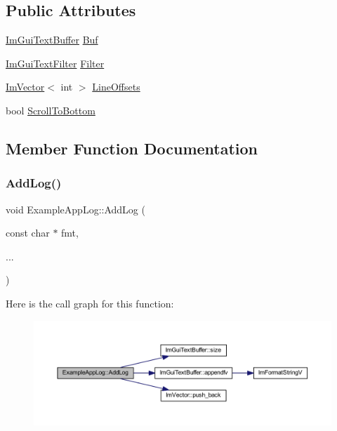 \subsection*{Public Attributes}
\begin{DoxyCompactItemize}
\item 
\mbox{\hyperlink{struct_im_gui_text_buffer}{Im\+Gui\+Text\+Buffer}} \mbox{\hyperlink{struct_example_app_log_a74fb7cd7bd8c2507b41331ebb7d0e56d}{Buf}}
\item 
\mbox{\hyperlink{struct_im_gui_text_filter}{Im\+Gui\+Text\+Filter}} \mbox{\hyperlink{struct_example_app_log_a4571947a6000e984ec8da9b7166e1e2b}{Filter}}
\item 
\mbox{\hyperlink{class_im_vector}{Im\+Vector}}$<$ int $>$ \mbox{\hyperlink{struct_example_app_log_af197fca7116f9033a5a5e831ee764ee2}{Line\+Offsets}}
\item 
bool \mbox{\hyperlink{struct_example_app_log_a6834b71563c0595e67b78afb6c7ce39d}{Scroll\+To\+Bottom}}
\end{DoxyCompactItemize}


\subsection{Member Function Documentation}
\mbox{\label{struct_example_app_log_afd296fb3b2559acd341fd92883f8f571}} 
\subsubsection{\texorpdfstring{Add\+Log()}{AddLog()}}
{\footnotesize\ttfamily void Example\+App\+Log\+::\+Add\+Log (\begin{DoxyParamCaption}\item[{const char $\ast$}]{fmt,  }\item[{}]{... }\end{DoxyParamCaption})\hspace{0.3cm}{\ttfamily [inline]}}

Here is the call graph for this function\+:
\nopagebreak
\begin{figure}[H]
\begin{center}
\leavevmode
\includegraphics[width=350pt]{struct_example_app_log_afd296fb3b2559acd341fd92883f8f571_cgraph}
\end{center}
\end{figure}
\mbox{\label{struct_example_app_log_ab9c298defddbb106fdfe4ab16c5eebac}} 
